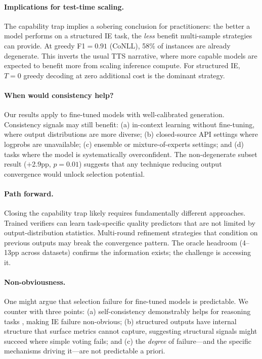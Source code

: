 \documentclass[11pt,twocolumn]{article}
\begin{document}
\paragraph{Implications for test-time scaling.}
The capability trap implies a sobering conclusion for practitioners: the better a model performs on a structured IE task, the \emph{less} benefit multi-sample strategies can provide.
At greedy F1${=}0.91$ (CoNLL), 58\% of instances are already degenerate.
This inverts the usual TTS narrative, where more capable models are expected to benefit more from scaling inference compute.
For structured IE, $T{=}0$ greedy decoding at zero additional cost is the dominant strategy.

\paragraph{When would consistency help?}
Our results apply to fine-tuned models with well-calibrated generation.
Consistency signals may still benefit: (a) in-context learning without fine-tuning, where output distributions are more diverse; (b) closed-source API settings where logprobs are unavailable; (c) ensemble or mixture-of-experts settings; and (d) tasks where the model is systematically overconfident.
The non-degenerate subset result ($+$2.9pp, $p{=}0.01$) suggests that any technique reducing output convergence would unlock selection potential.

\paragraph{Path forward.}
Closing the capability trap likely requires fundamentally different approaches.
Trained verifiers \citep{cobbe2021training,lightman2023lets} can learn task-specific quality predictors that are not limited by output-distribution statistics.
Multi-round refinement strategies that condition on previous outputs may break the convergence pattern.
The oracle headroom (4--13pp across datasets) confirms the information exists; the challenge is accessing it.

\paragraph{Non-obviousness.}
One might argue that selection failure for fine-tuned models is predictable.
We counter with three points: (a) self-consistency demonstrably helps for reasoning tasks \citep{wang2023selfconsistency}, making IE failure non-obvious; (b) structured outputs have internal structure that surface metrics cannot capture, suggesting structural signals might succeed where simple voting fails; and (c) the \emph{degree} of failure---and the specific mechanisms driving it---are not predictable a priori.
\end{document}
